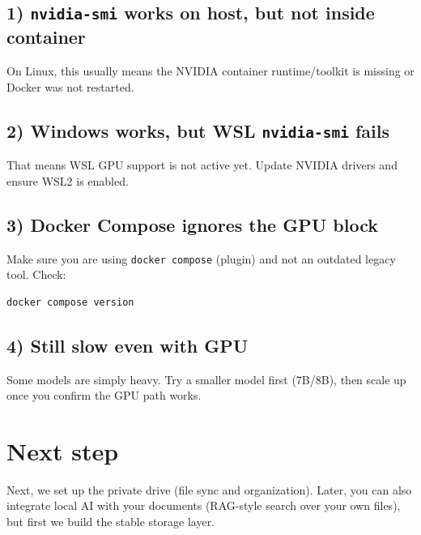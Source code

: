\subsection*{1) \texttt{nvidia-smi} works on host, but not inside container}
On Linux, this usually means the NVIDIA container runtime/toolkit is missing or Docker was not restarted.

\subsection*{2) Windows works, but WSL \texttt{nvidia-smi} fails}
That means WSL GPU support is not active yet. Update NVIDIA drivers and ensure WSL2 is enabled.

\subsection*{3) Docker Compose ignores the GPU block}
Make sure you are using \texttt{docker compose} (plugin) and not an outdated legacy tool.
Check:
\begin{lstlisting}
docker compose version
\end{lstlisting}

\subsection*{4) Still slow even with GPU}
Some models are simply heavy. Try a smaller model first (7B/8B),
then scale up once you confirm the GPU path works.


\section{Next step}
Next, we set up the private drive (file sync and organization).
Later, you can also integrate local AI with your documents (RAG-style search over your own files),
but first we build the stable storage layer. 